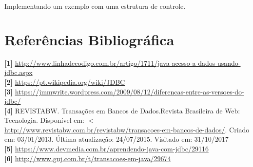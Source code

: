 \documentclass[12pt,a4paper]{article}
\begin{document}
Implementando um exemplo com uma estrutura de controle.

%
\newpage
\section{Referências Bibliográfica}
\noindent \textbf{[1]} \url {http://www.linhadecodigo.com.br/artigo/1711/java-acesso-a-dados-usando-jdbc.aspx}
\\\vspace{0.2cm}
\noindent \textbf{[2] }\url{https://pt.wikipedia.org/wiki/JDBC}
\\\vspace{0.2cm}
\noindent \textbf{[3]} \url {https://jmmwrite.wordpress.com/2009/08/12/diferencas-entre-as-versoes-do-jdbc/}
\\\vspace{0.2cm}
\noindent\textbf{[4]} REVISTABW. Transações em Bancos de Dados.Revista Brasileira de Web: Tecnologia. Disponível em: $<$\url{http://www.revistabw.com.br/revistabw/transacoes-em-bancos-de-dados/}. Criado em: 03/01/2013. Última atualização: 24/07/2015. Visitado em: 31/10/2017 \\\vspace{0.2cm}
\noindent\textbf{[5]} \url{https://www.devmedia.com.br/aprendendo-java-com-jdbc/29116}
\\\vspace{0.2cm}
\noindent\textbf{[6]} \url{http://www.guj.com.br/t/transacoes-em-java/29674}
\end{document}
